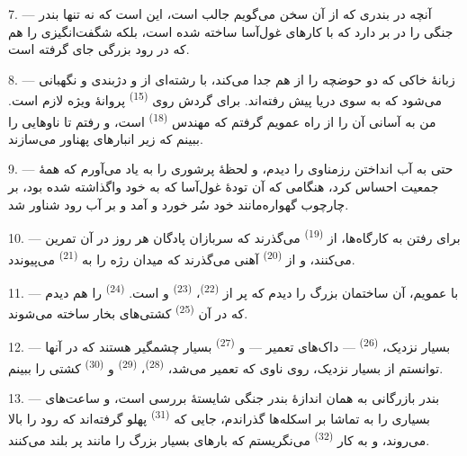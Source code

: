 \VUsaut{3.0mm}
\VUsaut{3.0mm}

7. --- آنچه در بندری که از آن سخن می‌گویم جالب است، این است که نه تنها
بندر جنگی را در بر دارد که با کارهای غول‌آسا ساخته شده است، بلکه
 شگفت‌انگیزی را هم که در  رود بزرگی
جای گرفته است.

8. --- زبانهٔ خاکی که دو حوضچه را از هم جدا می‌کند، با رشته‌ای از
 و  دژبندی و نگهبانی می‌شود که به سوی
دریا پیش رفته‌اند. برای گردش روی 
\textsuperscript{(15)} پروانهٔ ویژه لازم است. من به آسانی آن را از
راه عمویم گرفتم که مهندس 
\textsuperscript{(18)} است، و رفتم تا ناوهایی را ببینم که زیر انبارهای
پهناور می‌سازند.

9. --- حتی به آب انداختن رزمناوی را دیدم، و لحظهٔ پرشوری را به یاد
می‌آورم که همهٔ جمعیت احساس کرد، هنگامی که آن تودهٔ غول‌آسا که به خود
واگذاشته شده بود، بر چارچوب گهواره‌مانند خود سُر خورد و آمد و بر آب
رود شناور شد.

10. --- برای رفتن به کارگاه‌ها، از 
\textsuperscript{(19)} می‌گذرند که سربازان پادگان هر روز در آن تمرین
می‌کنند، و از  \textsuperscript{(20)} آهنی می‌گذرند که
میدان رژه را به  \textsuperscript{(21)} می‌پیوندد.

\VUsaut{3.0mm}
\VUsaut{3.0mm}

11. --- با عمویم، آن ساختمان بزرگ را دیدم که پر از 
\textsuperscript{(22)}،  \textsuperscript{(23)} و
 است.  \textsuperscript{(24)}
را هم دیدم که در آن  \textsuperscript{(25)}
کشتی‌های بخار ساخته می‌شوند.

12. --- بسیار نزدیک،  \textsuperscript{(26)} — داک‌های
تعمیر — و  \textsuperscript{(27)} بسیار
چشمگیر هستند که در آنها توانستم از بسیار نزدیک، روی ناوی که تعمیر
می‌شد،  \textsuperscript{(28)}، 
\textsuperscript{(29)} و  \textsuperscript{(30)} کشتی را
ببینم.

13. --- بندر بازرگانی به همان اندازهٔ بندر جنگی شایستهٔ بررسی است، و
ساعت‌های بسیاری را به تماشا بر اسکله‌ها گذراندم، جایی که
 \textsuperscript{(31)} پهلو گرفته‌اند که رود
را بالا می‌روند، و به کار 
\textsuperscript{(32)} می‌نگریستم که بارهای بسیار بزرگ را مانند پر
بلند می‌کنند.

